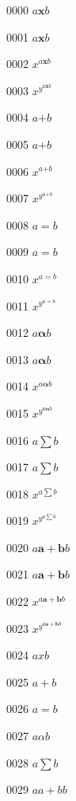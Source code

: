 \documentclass{article}
\begin{document}
0000 $a\pmb{x}b$\par
0001 $\displaystyle a\pmb{x}b$\par
0002 $x^{a\pmb{x}b}$\par
0003 $x^{y^{a\pmb{x}b}}$\par
0004 $a\pmb{+}b$\par
0005 $\displaystyle a\pmb{+}b$\par
0006 $x^{a\pmb{+}b}$\par
0007 $x^{y^{a\pmb{+}b}}$\par
0008 $a\pmb{=}b$\par
0009 $\displaystyle a\pmb{=}b$\par
0010 $x^{a\pmb{=}b}$\par
0011 $x^{y^{a\pmb{=}b}}$\par
0012 $a\pmb{\alpha}b$\par
0013 $\displaystyle a\pmb{\alpha}b$\par
0014 $x^{a\pmb{\alpha}b}$\par
0015 $x^{y^{a\pmb{\alpha}b}}$\par
0016 $a\pmb{\sum}b$\par
0017 $\displaystyle a\pmb{\sum}b$\par
0018 $x^{a\pmb{\sum}b}$\par
0019 $x^{y^{a\pmb{\sum}b}}$\par
0020 $a\pmb{a+b}b$\par
0021 $\displaystyle a\pmb{a+b}b$\par
0022 $x^{a\pmb{a+b}b}$\par
0023 $x^{y^{a\pmb{a+b}b}}$\par
0024 $ax b$\par
0025 $a+ b$\par
0026 $a= b$\par
0027 $a\alpha b$\par
0028 $a\sum b$\par
0029 $aa+b b$\par
\end{document}
